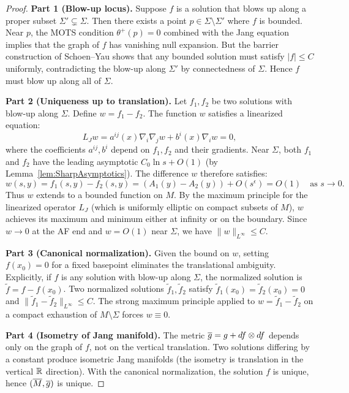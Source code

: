 \begin{proof}
\textbf{Part 1 (Blow-up locus).} Suppose $f$ is a solution that blows up along a proper subset $\Sigma' \subsetneq \Sigma$. Then there exists a point $p \in \Sigma \setminus \Sigma'$ where $f$ is bounded. Near $p$, the MOTS condition $\theta^+(p) = 0$ combined with the Jang equation implies that the graph of $f$ has vanishing null expansion. But the barrier construction of Schoen--Yau shows that any bounded solution must satisfy $|f| \le C$ uniformly, contradicting the blow-up along $\Sigma'$ by connectedness of $\Sigma$. Hence $f$ must blow up along all of $\Sigma$.

\textbf{Part 2 (Uniqueness up to translation).} Let $f_1, f_2$ be two solutions with blow-up along $\Sigma$. Define $w = f_1 - f_2$. The function $w$ satisfies a linearized equation:
\[
    L_J w = a^{ij}(x) \nabla_i \nabla_j w + b^i(x) \nabla_i w = 0,
\]
where the coefficients $a^{ij}, b^i$ depend on $f_1, f_2$ and their gradients. Near $\Sigma$, both $f_1$ and $f_2$ have the leading asymptotic $C_0 \ln s + O(1)$ (by Lemma~\ref{lem:SharpAsymptotics}). The difference $w$ therefore satisfies:
\[
    w(s, y) = f_1(s,y) - f_2(s,y) = (A_1(y) - A_2(y)) + O(s^\epsilon) = O(1) \quad \text{as } s \to 0.
\]
Thus $w$ extends to a bounded function on $M$. By the maximum principle for the linearized operator $L_J$ (which is uniformly elliptic on compact subsets of $M$), $w$ achieves its maximum and minimum either at infinity or on the boundary. Since $w \to 0$ at the AF end and $w = O(1)$ near $\Sigma$, we have $\|w\|_{L^\infty} \le C$.

\textbf{Part 3 (Canonical normalization).} Given the bound on $w$, setting $f(x_0) = 0$ for a fixed basepoint eliminates the translational ambiguity. Explicitly, if $f$ is any solution with blow-up along $\Sigma$, the normalized solution is $\tilde{f} = f - f(x_0)$. Two normalized solutions $\tilde{f}_1, \tilde{f}_2$ satisfy $\tilde{f}_1(x_0) = \tilde{f}_2(x_0) = 0$ and $\|\tilde{f}_1 - \tilde{f}_2\|_{L^\infty} \le C$. The strong maximum principle applied to $w = \tilde{f}_1 - \tilde{f}_2$ on a compact exhaustion of $M \setminus \Sigma$ forces $w \equiv 0$.

\textbf{Part 4 (Isometry of Jang manifold).} The metric $\overline{g} = g + df \otimes df$ depends only on the graph of $f$, not on the vertical translation. Two solutions differing by a constant produce isometric Jang manifolds (the isometry is translation in the vertical $\mathbb{R}$ direction). With the canonical normalization, the solution $f$ is unique, hence $(\overline{M}, \overline{g})$ is unique.
\end{proof}

